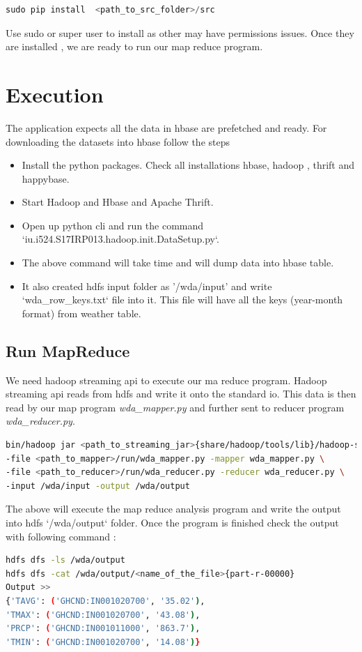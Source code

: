 \documentclass[9pt,twocolumn,twoside]{../../styles/osajnl}
\begin{document}
\begin{lstlisting}[language=Python,caption=Install python packages,breaklines=true]
sudo pip install  <path_to_src_folder>/src
\end{lstlisting}

Use sudo or super user to install as other may have permissions issues. Once they are installed , we are ready to run our map reduce program.

\section{Execution}
The application expects all the data in hbase are prefetched and ready. For downloading the datasets into hbase follow the steps 
\begin{itemize}

\item Install the python packages. Check all installations hbase, hadoop , thrift and happybase.
\item Start Hadoop and Hbase and Apache Thrift.
\item Open up python cli and run the command  `iu.i524.S17IRP013.hadoop.init.DataSetup.py`.
\item The above command will take time and will dump data into hbase table.
\item It also created hdfs input folder as '/wda/input' and write `wda\_row\_keys.txt` file into it. This file will have all the keys (year-month format) from weather table.  

\end{itemize}

\subsection{Run MapReduce}
We need hadoop streaming api to execute our ma reduce program. Hadoop streaming api reads from hdfs and write it onto the standard io. This data is then read by our map program \textit{wda\_mapper.py} and further sent to reducer program \textit{wda\_reducer.py}.
\begin{lstlisting}[language=bash,caption=Run MapReduce,breaklines=true]
bin/hadoop jar <path_to_streaming_jar>{share/hadoop/tools/lib}/hadoop-streaming-2.7.3.jar \
-file <path_to_mapper>/run/wda_mapper.py -mapper wda_mapper.py \
-file <path_to_reducer>/run/wda_reducer.py -reducer wda_reducer.py \
-input /wda/input -output /wda/output
\end{lstlisting}
The above will  execute the map reduce analysis program and write the output into hdfs `/wda/output` folder. Once the program is finished check the output with following command :
\begin{lstlisting}[language=bash,caption=Run MapReduce,breaklines=true]
hdfs dfs -ls /wda/output
hdfs dfs -cat /wda/output/<name_of_the_file>{part-r-00000}
Output >>
{'TAVG': ('GHCND:IN001020700', '35.02'), 
'TMAX': ('GHCND:IN001020700', '43.08'), 
'PRCP': ('GHCND:IN001011000', '863.7'), 
'TMIN': ('GHCND:IN001020700', '14.08')}
\end{lstlisting}
\end{document}
